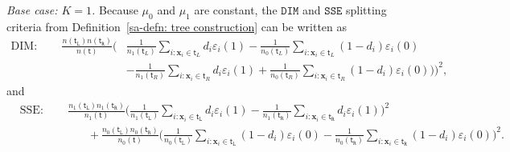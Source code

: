 \documentclass[10pt]{article}
\def\nodet{\mathsf{t}}
\def\bx{\mathbf{x}}
\def\ttL{\mathtt{L}}
\def\ttR{\mathtt{R}}
\def\DIM{\mathtt{DIM}}
\def\SSE{\mathtt{SSE}}
\theoremstyle{definition}
\theoremstyle{remark}
\begin{document}
\textit{Base case: $K = 1$.} Because $\mu_0$ and $\mu_1$ are constant, the $\DIM$ and $\SSE$ splitting criteria from Definition~\ref{sa-defn: tree construction} can be written as
\begin{align}\label{sa-eq: split dim}
    \nonumber  \text{DIM} : \qquad \frac{n(\nodet_{\mathtt{L}})n(\nodet_{\mathtt{R}})}{n(\nodet)}
                \Big(& \frac{1}{n_{1}(\nodet_L)} \sum_{i:\bx_i \in \nodet_L} d_i \varepsilon_i(1) 
            - \frac{1}{n_{0}(\nodet_L)} \sum_{i:\bx_i \in \nodet_L} (1-d_i) \varepsilon_i(0)
            \\
    & - \frac{1}{n_{1}(\nodet_R)} \sum_{i:\bx_i \in \nodet_R} d_i \varepsilon_i(1) 
            + \frac{1}{n_{0}(\nodet_R)} \sum_{i:\bx_i \in \nodet_R} (1-d_i) \varepsilon_i(0))\Big)^2, 
\end{align}
and
\begin{align}\label{sa-eq: split sse}
    \nonumber & \text{SSE}: \qquad \frac{n_1(\nodet_{\mathtt{L}})n_1(\nodet_{\mathtt{R}})}{n_1(\nodet)}
                \Big( \frac{1}{n_1(\nodet_{\mathtt{L}})} \sum_{i: \bx_i \in \nodet_{\ttL}} d_i \varepsilon_i(1)
                    - \frac{1}{n_1(\nodet_{\mathtt{R}})} \sum_{i: \bx_i \in \nodet_{\ttR}} d_i \varepsilon_i(1) \Big)^2 \\
        & \qquad \qquad \qquad +
        \frac{n_0(\nodet_{\mathtt{L}})n_0(\nodet_{\mathtt{R}})}{n_0(\nodet)}
                \Big( \frac{1}{n_0(\nodet_{\mathtt{L}})} \sum_{i: \bx_i \in \nodet_{\ttL}} (1 - d_i) \varepsilon_i(0)
                    - \frac{1}{n_0(\nodet_{\mathtt{R}})} \sum_{i: \bx_i \in \nodet_{\ttR}} (1 - d_i) \varepsilon_i(0) \Big)^2.
\end{align}
\end{document}
